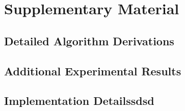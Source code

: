 \section{Supplementary Material}
\label{app:supplementary}


\subsection{Detailed Algorithm Derivations}
\label{app:derivations}


\subsection{Additional Experimental Results}
\label{app:additional_results}


\subsection{Implementation Detailssdsd}
\label{app:implementation}

